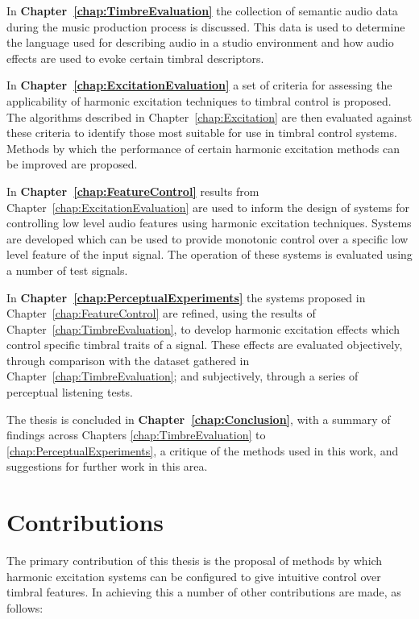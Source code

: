 	In {\bf{Chapter~\ref{chap:TimbreEvaluation}}} the collection of semantic audio data during the music production
	process is discussed. This data is used to determine the language used for describing audio in a studio environment
	and how audio effects are used to evoke certain timbral descriptors.

	In {\bf{Chapter~\ref{chap:ExcitationEvaluation}}} a set of criteria for assessing the applicability of harmonic
	excitation techniques to timbral control is proposed. The algorithms described in Chapter~\ref{chap:Excitation} are
	then evaluated against these criteria to identify those most suitable for use in timbral control systems.  Methods
	by which the performance of certain harmonic excitation methods can be improved are proposed.

	In {\bf{Chapter~\ref{chap:FeatureControl}}} results from Chapter~\ref{chap:ExcitationEvaluation} are used to inform
	the design of systems for controlling low level audio features using harmonic excitation techniques. Systems are
	developed which can be used to provide monotonic control over a specific low level feature of the input signal. The
	operation of these systems is evaluated using a number of test signals.

	In {\bf{Chapter~\ref{chap:PerceptualExperiments}}} the systems proposed in Chapter~\ref{chap:FeatureControl} are
	refined, using the results of Chapter~\ref{chap:TimbreEvaluation}, to develop harmonic excitation effects which
	control specific timbral traits of a signal. These effects are evaluated objectively, through comparison with the
	dataset gathered in Chapter~\ref{chap:TimbreEvaluation}; and subjectively, through a series of perceptual listening
	tests.

	The thesis is concluded in {\bf{Chapter~\ref{chap:Conclusion}}}, with a summary of findings across Chapters
	\ref{chap:TimbreEvaluation} to \ref{chap:PerceptualExperiments}, a critique of the methods used in this work, and
	suggestions for further work in this area.

\section{Contributions}
\label{sec:Introduction-Contributions}
	The primary contribution of this thesis is the proposal of methods by which harmonic excitation systems can be
	configured to give intuitive control over timbral features. In achieving this a number of other contributions are
	made, as follows:

